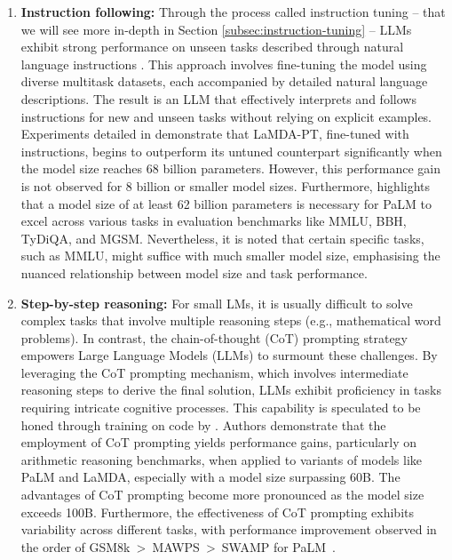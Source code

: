 \begin{enumerate}
{\begin{enumerate}
{				            The surprising fact is that the LM isn’t trained to learn from examples. Because of this, there’s seemingly a mismatch between pretraining (what it’s trained to do, which is next token prediction) and in-context learning (what we’re asking it to do).
			            }
			      \item \textbf{Instruction following:}{
				            Through the process called instruction tuning -- that we will see more in-depth in Section  \ref{subsec:instruction-tuning} -- LLMs exhibit strong performance on unseen tasks described through natural language instructions \cite{sanhetal2022multitask, ouyang2022training, wei2022fine}.
				            This approach involves fine-tuning the model using diverse multitask datasets, each accompanied by detailed natural language descriptions. The result is an LLM that effectively interprets and follows instructions for new and unseen tasks without relying on explicit examples.
				            Experiments detailed in \textcite{wei2022fine} demonstrate that LaMDA-PT, fine-tuned with instructions, begins to outperform its untuned counterpart significantly when the model size reaches 68 billion parameters. However, this performance gain is not observed for 8 billion or smaller model sizes. Furthermore, \textcite{chung2022scaling} highlights that a model size of at least 62 billion parameters is necessary for PaLM to excel across various tasks in evaluation benchmarks like MMLU, BBH, TyDiQA, and MGSM. Nevertheless, it is noted that certain specific tasks, such as MMLU, might suffice with much smaller model size, emphasising the nuanced relationship between model size and task performance.
			            }
			      \item \textbf{Step-by-step reasoning:} { For small LMs, it is usually difficult to solve complex tasks that involve multiple reasoning steps (e.g., mathematical word problems).
				            In contrast, the chain-of-thought (CoT) prompting strategy \cite{wei2022chain} empowers Large Language Models (LLMs) to surmount these challenges. By leveraging the CoT prompting mechanism, which involves intermediate reasoning steps to derive the final solution, LLMs exhibit proficiency in tasks requiring intricate cognitive processes. This capability is speculated to be honed through training on code by \textcite{wei2022chain}. Authors demonstrate that the employment of CoT prompting yields performance gains, particularly on arithmetic reasoning benchmarks, when applied to variants of models like PaLM and LaMDA, especially with a model size surpassing 60B. The advantages of CoT prompting become more pronounced as the model size exceeds 100B. Furthermore, the effectiveness of CoT prompting exhibits variability across different tasks, with performance improvement observed in the order of GSM8k~\textgreater~MAWPS~\textgreater~SWAMP for PaLM~\cite{wei2022chain}.
}
\end{enumerate}}
\end{enumerate}
